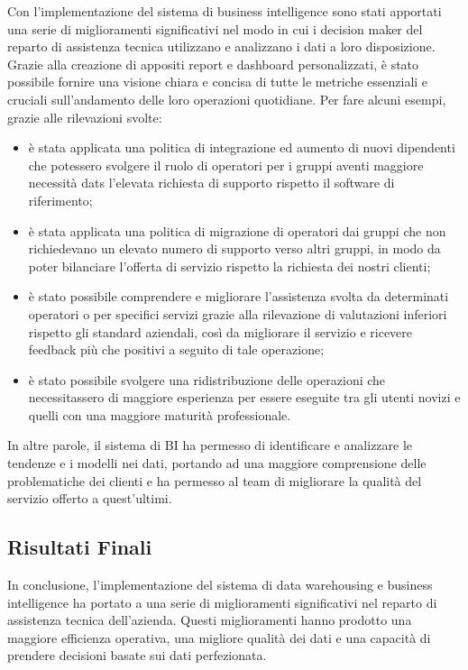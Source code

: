 Con l'implementazione del sistema di business intelligence sono stati apportati una serie di miglioramenti significativi nel modo in cui i decision maker del reparto di assistenza tecnica utilizzano e analizzano i dati a loro disposizione. Grazie alla creazione di appositi report e dashboard personalizzati, è stato possibile fornire una visione chiara e concisa di tutte le metriche essenziali e cruciali sull'andamento delle loro operazioni quotidiane. Per fare alcuni esempi, grazie alle rilevazioni svolte:

\begin{itemize}
    \item è stata applicata una politica di integrazione ed aumento di nuovi dipendenti che potessero svolgere il ruolo di operatori per i gruppi aventi maggiore necessità dats l'elevata richiesta di supporto rispetto il software di riferimento;
    \item è stata applicata una politica di migrazione di operatori dai gruppi che non richiedevano un elevato numero di supporto verso altri gruppi, in modo da poter bilanciare l'offerta di servizio rispetto la richiesta dei nostri clienti;
    \item è stato possibile comprendere e migliorare l'assistenza svolta da determinati operatori o per specifici servizi grazie alla rilevazione di valutazioni inferiori rispetto gli standard aziendali, così da migliorare il servizio e ricevere feedback più che positivi a seguito di tale operazione;
    \item è stato possibile svolgere una ridistribuzione delle operazioni che necessitassero di maggiore esperienza per essere eseguite tra gli utenti novizi e quelli con una maggiore maturità professionale.
\end{itemize}

In altre parole, il sistema di BI ha permesso di identificare e analizzare le tendenze e i modelli nei dati, portando ad una maggiore comprensione delle problematiche dei clienti e ha permesso al team di migliorare la qualità del servizio offerto a quest'ultimi.

\subsection{Risultati Finali}

In conclusione, l'implementazione del sistema di data warehousing e business intelligence ha portato a una serie di miglioramenti significativi nel reparto di assistenza tecnica dell'azienda. Questi miglioramenti hanno prodotto una maggiore efficienza operativa, una migliore qualità dei dati e una capacità di prendere decisioni basate sui dati perfezionata.
